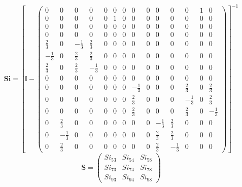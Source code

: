 \[ \mathbf{Si} = \left[ \mathbb{I}  -
\left(\begin{array}{cccccccccccccc} 0 & 0 & 0 & 0 & 0 & 0 & 0 & 0 & 0
& 0 & 0 & 0 & 1 & 0 \\ 0 & 0 & 0 & 0 & 0 & 1 & 0 & 0 & 0 & 0 & 0 & 0 &
0 & 0 \\ 0 & 0 & 0 & 0 & 0 & 0 & 0 & 0 & 0 & 0 & 0 & 0 & 0 & 0 \\ 0 &
0 & 0 & 0 & 0 & 0 & 0 & 0 & 0 & 0 & 0 & 0 & 0 & 0 \\ \frac{2}{3} & 0 &
-\frac{1}{3} & \frac{2}{3} & 0 & 0 & 0 & 0 & 0 & 0 & 0 & 0 & 0 & 0 \\
-\frac{1}{3} & 0 & \frac{2}{3} & \frac{2}{3} & 0 & 0 & 0 & 0 & 0 & 0 &
0 & 0 & 0 & 0 \\ \frac{2}{3} & 0 & \frac{2}{3} & -\frac{1}{3} & 0 & 0
& 0 & 0 & 0 & 0 & 0 & 0 & 0 & 0 \\ 0 & 0 & 0 & 0 & 0 & 0 & 0 & 0 & 0 &
0 & 0 & 0 & 0 & 0 \\ 0 & 0 & 0 & 0 & 0 & 0 & 0 & -\frac{1}{3} & 0 & 0
& 0 & \frac{2}{3} & 0 & \frac{2}{3} \\ 0 & 0 & 0 & 0 & 0 & 0 & 0 &
\frac{2}{3} & 0 & 0 & 0 & -\frac{1}{3} & 0 & \frac{2}{3} \\ 0 & 0 & 0
& 0 & 0 & 0 & 0 & \frac{2}{3} & 0 & 0 & 0 & \frac{2}{3} & 0 &
-\frac{1}{3} \\ 0 & \frac{2}{3} & 0 & 0 & 0 & 0 & 0 & 0 & 0 &
-\frac{1}{3} & \frac{2}{3} & 0 & 0 & 0 \\ 0 & -\frac{1}{3} & 0 & 0 & 0
& 0 & 0 & 0 & 0 & \frac{2}{3} & \frac{2}{3} & 0 & 0 & 0 \\ 0 &
\frac{2}{3} & 0 & 0 & 0 & 0 & 0 & 0 & 0 & \frac{2}{3} & -\frac{1}{3} &
0 & 0 & 0 \end{array}\right) \right]^{-1} \]
\[ \mathbf{S} = \left(\begin{array}{ccc} Si_{53} & Si_{54} & Si_{58}
\\ Si_{73} & Si_{74} & Si_{78} \\ Si_{93} & Si_{94} & Si_{98}
\end{array}\right) \]

